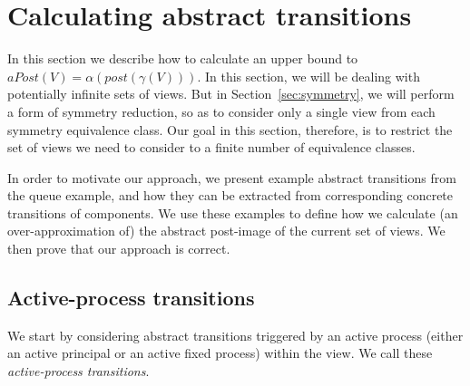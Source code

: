 
\section{Calculating abstract transitions}
\label{sec:transitions}

In this section we describe how to calculate an upper bound to $aPost(V) =
\alpha(post(\gamma(V)))$.  In this section, we will be dealing with
potentially infinite sets of views.  But in Section~\ref{sec:symmetry}, we
will perform a form of symmetry reduction, so as to consider only a single
view from each symmetry equivalence class.  Our goal in this section,
therefore, is to restrict the set of views we need to consider to a finite
number of equivalence classes.

In order to motivate our approach, we present example abstract transitions
from the queue example, and how they can be extracted from
corresponding concrete transitions of components.  We use these examples to
define how we calculate (an over-approximation of) the abstract post-image of
the current set of views.  We then prove that our approach is correct.

\subsection{Active-process transitions}

We start by considering abstract transitions triggered by an active process
(either an active principal or an active fixed process) within the view.  We
call these \emph{active-process transitions}.

